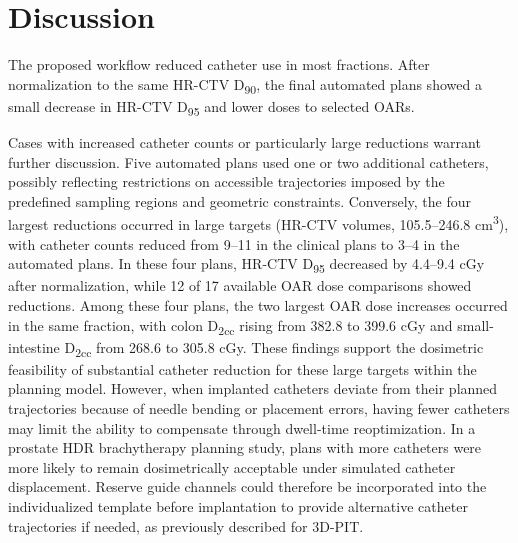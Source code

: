 \documentclass[12pt,twoside,letterpaper]{article}
\begin{document}
\begin{table}[H]
\begin{minipage}{\linewidth}
\end{minipage}
\end{table}

\section{Discussion}\label{sec:4}

The proposed workflow reduced catheter use in most fractions. After normalization to the same HR-CTV D\textsubscript{90}, the final automated plans showed a small decrease in HR-CTV D\textsubscript{95} and lower doses to selected OARs.

Cases with increased catheter counts or particularly large reductions warrant further discussion. Five automated plans used one or two additional catheters, possibly reflecting restrictions on accessible trajectories imposed by the predefined sampling regions and geometric constraints. Conversely, the four largest reductions occurred in large targets (HR-CTV volumes, 105.5--246.8 cm\textsuperscript{3}), with catheter counts reduced from 9--11 in the clinical plans to 3--4 in the automated plans. In these four plans, HR-CTV D\textsubscript{95} decreased by 4.4--9.4 cGy after normalization, while 12 of 17 available OAR dose comparisons showed reductions. Among these four plans, the two largest OAR dose increases occurred in the same fraction, with colon D\textsubscript{2cc} rising from 382.8 to 399.6 cGy and small-intestine D\textsubscript{2cc} from 268.6 to 305.8 cGy. These findings support the dosimetric feasibility of substantial catheter reduction for these large targets within the planning model. However, when implanted catheters deviate from their planned trajectories because of needle bending or placement errors,\cite{ref13} having fewer catheters may limit the ability to compensate through dwell-time reoptimization. In a prostate HDR brachytherapy planning study, plans with more catheters were more likely to remain dosimetrically acceptable under simulated catheter displacement.\cite{ref68} Reserve guide channels could therefore be incorporated into the individualized template before implantation to provide alternative catheter trajectories if needed, as previously described for 3D-PIT.\cite{ref21}
\end{document}
